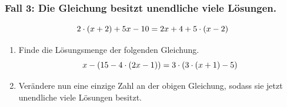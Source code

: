 \documentclass[11pt,oneside]{article}
\begin{document}
	\subsubsection*{Fall 3: Die Gleichung besitzt \textbf{unendliche viele} Lösungen.}
		\[2\cdot(x+2)+5x-10=2x+4+5\cdot(x-2)\]
	\begin{aufgabe}
		\begin{enumerate}[label=\alph*)]
			\item Finde die Lösungsmenge der folgenden Gleichung. \[x-\left(15-4\cdot(2x-1)\right)=3\cdot\left(3\cdot(x+1)-5\right)\]
			\item Verändere nun eine einzige Zahl an der obigen Gleichung, sodass sie jetzt unendliche viele Lösungen besitzt.
		\end{enumerate}
	\end{aufgabe}

\newpage
\end{document}
